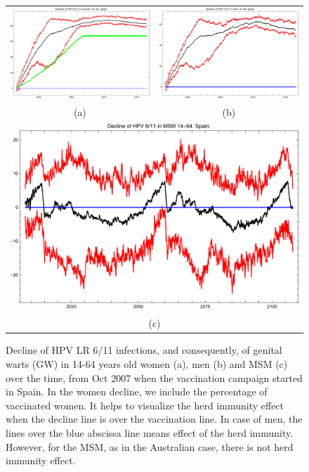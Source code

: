 \begin{figure}[!]
	\centering
	\begin{tabular}{cc}
		\includegraphics[width=0.5\linewidth]{IMGs/4.-Spain/Decl_muj_14_64_verr_ESP.pdf}	& 
		\includegraphics[width=0.5\linewidth]{IMGs/4.-Spain/Decl_hom_14_64_verr_ESP.pdf}  \\ 
		(a)	& (b) \\ 
		\multicolumn{2}{c}{ \includegraphics[width=0.5\linewidth]{IMGs/4.-Spain/Decl_MSM_14_64_verr_ESP.pdf} } \\ 
		\multicolumn{2}{c}{(c)} \\ 
	\end{tabular} 
	\caption{Decline of HPV LR 6/11 infections, and consequently, of genital warts (GW) in 14-64 years old women (a), men (b) and MSM (c) over the time, from Oct 2007 when the vaccination campaign started in Spain. In the women decline, we include the percentage of vaccinated women. It helps to visualize the herd immunity effect when the decline line is over the vaccination line. In case of men, the lines over the blue abscissa line means effect of the herd immunity. However, for the MSM, as in the Australian case, there is not herd immunity effect.}
	\label{fig:verrESP}
\end{figure}

